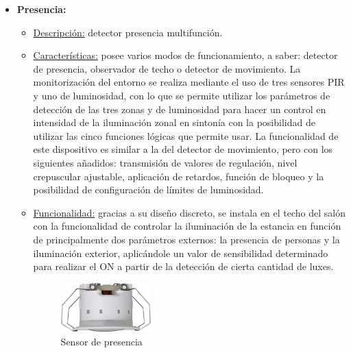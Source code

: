 \begin{itemize}
\item \textbf{Presencia:} 
	\begin{itemize}
	\item\underline{Descripción:} detector presencia multifunción.
	\item \underline{Características:} posee varios modos de funcionamiento, a saber: detector de presencia, observador de techo o detector de movimiento. La monitorización del entorno se realiza mediante el uso de tres sensores PIR y uno de luminosidad, con lo que se permite utilizar los parámetros de detección de las tres zonas y de luminosidad para hacer un control en intensidad de la iluminación zonal en sintonía con la posibilidad de utilizar las cinco funciones lógicas que permite usar. La funcionalidad de este dispositivo es similar a la del detector de movimiento, pero con los siguientes añadidos: transmisión de valores de regulación, nivel crepuscular ajustable, aplicación de retardos, función de bloqueo y la posibilidad de configuración de límites de luminosidad.
	\item \underline{Funcionalidad:} gracias a su diseño discreto, se instala en el techo del salón con la funcionalidad de controlar la iluminación de la estancia en función de principalmente dos parámetros externos: la presencia de personas y la iluminación exterior, aplicándole un valor de sensibilidad determinado para realizar el ON a partir de la detección de cierta cantidad de luxes.
	\begin{figure}[H]
	\centering
	\includegraphics[width=0.35\textwidth]{figures/sensor_presencia.png}   
	\caption{Sensor de presencia}
	\label{fig:sensor_presencia}
	\end{figure}
	\end{itemize}


\end{itemize}
